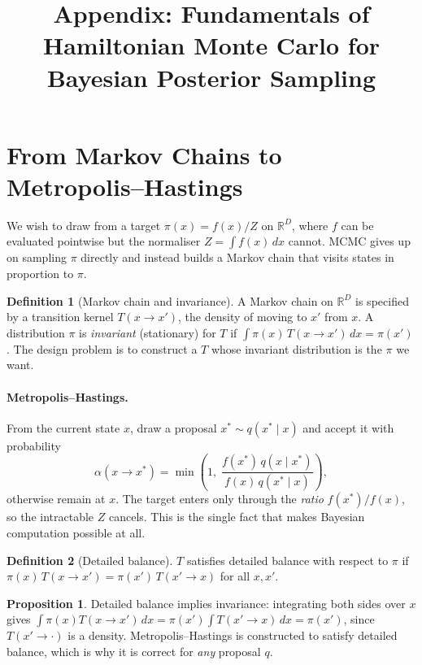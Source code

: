 \documentclass[10pt,a4paper]{article}
\title{\vspace{-2em}\textbf{Appendix: Fundamentals of Hamiltonian Monte Carlo
       for Bayesian Posterior Sampling}}
\author{}
\date{}
\theoremstyle{definition}
\newtheorem*{defn}{Definition}
\newtheorem*{prop}{Proposition}
\begin{document}
\maketitle
\vspace{-3em}

\section{From Markov Chains to Metropolis--Hastings}

We wish to draw from a target $\pi(x) = f(x)/Z$ on $\mathbb{R}^D$, where $f$ can
be evaluated pointwise but the normaliser $Z = \int f(x)\,dx$ cannot. MCMC gives
up on sampling $\pi$ directly and instead builds a Markov chain that visits
states in proportion to $\pi$.

\begin{defn}[Markov chain and invariance]
A Markov chain on $\mathbb{R}^D$ is specified by a transition kernel
$T(x \to x')$, the density of moving to $x'$ from $x$. A distribution $\pi$ is
\emph{invariant} (stationary) for $T$ if
$\int \pi(x)\, T(x \to x')\, dx = \pi(x')$. The design problem is to construct a
$T$ whose invariant distribution is the $\pi$ we want.
\end{defn}

\paragraph{Metropolis--Hastings.} From the current state $x$, draw a proposal
$x^{*} \sim q(x^{*} \mid x)$ and accept it with probability
\[
  \alpha(x \to x^{*})
  = \min\!\left(1,\; \frac{f(x^{*})\, q(x \mid x^{*})}
                          {f(x)\, q(x^{*} \mid x)}\right),
\]
otherwise remain at $x$. The target enters only through the \emph{ratio}
$f(x^{*})/f(x)$, so the intractable $Z$ cancels. This is the single fact that
makes Bayesian computation possible at all.

\begin{defn}[Detailed balance]
$T$ satisfies detailed balance with respect to $\pi$ if
$\pi(x)\, T(x \to x') = \pi(x')\, T(x' \to x)$ for all $x, x'$.
\end{defn}

\begin{prop}
Detailed balance implies invariance: integrating both sides over $x$ gives
$\int \pi(x) T(x \to x')\,dx = \pi(x') \int T(x' \to x)\,dx = \pi(x')$, since
$T(x' \to \cdot)$ is a density. Metropolis--Hastings is constructed to satisfy
detailed balance, which is why it is correct for \emph{any} proposal $q$.
\end{prop}
\end{document}
